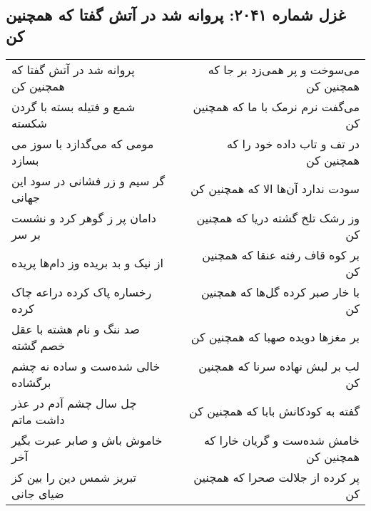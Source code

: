 \begin{center}
\section*{غزل شماره ۲۰۴۱: پروانه شد در آتش گفتا که همچنین کن}
\label{sec:2041}
\begin{longtable}{l p{0.5cm} r}
پروانه شد در آتش گفتا که همچنین کن
&&
می‌سوخت و پر همی‌زد بر جا که همچنین کن
\\
شمع و فتیله بسته با گردن شکسته
&&
می‌گفت نرم نرمک با ما که همچنین کن
\\
مومی که می‌گدازد با سوز می بسازد
&&
در تف و تاب داده خود را که همچنین کن
\\
گر سیم و زر فشانی در سود این جهانی
&&
سودت ندارد آن‌ها الا که همچنین کن
\\
دامان پر ز گوهر کرد و نشست بر سر
&&
وز رشک تلخ گشته دریا که همچنین کن
\\
از نیک و بد بریده وز دام‌ها پریده
&&
بر کوه قاف رفته عنقا که همچنین کن
\\
رخساره پاک کرده دراعه چاک کرده
&&
با خار صبر کرده گل‌ها که همچنین کن
\\
صد ننگ و نام هشته با عقل خصم گشته
&&
بر مغزها دویده صهبا که همچنین کن
\\
خالی شده‌ست و ساده نه چشم برگشاده
&&
لب بر لبش نهاده سرنا که همچنین کن
\\
چل سال چشم آدم در عذر داشت ماتم
&&
گفته به کودکانش بابا که همچنین کن
\\
خاموش باش و صابر عبرت بگیر آخر
&&
خامش شده‌ست و گریان خارا که همچنین کن
\\
تبریز شمس دین را بین کز ضیای جانی
&&
پر کرده از جلالت صحرا که همچنین کن
\\
\end{longtable}
\end{center}
